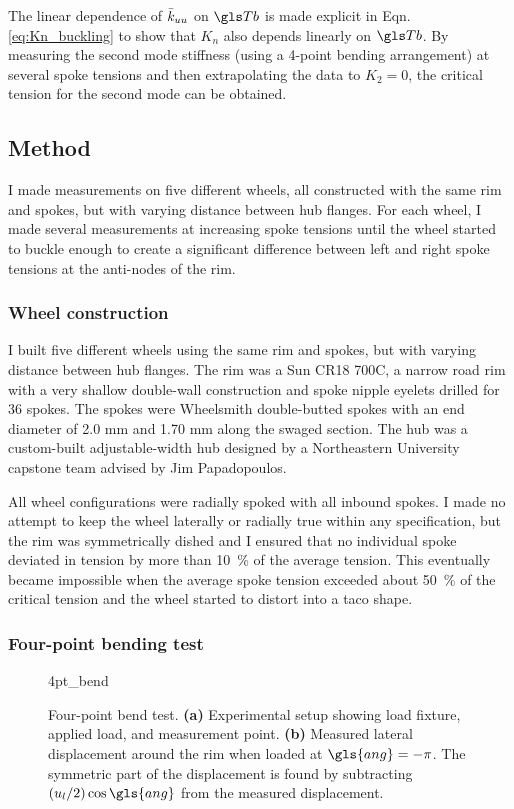 \documentclass[\rootdir/thesis.tex]{subfiles}
\begin{document}
The linear dependence of $\bar{k}_{uu}$ on $\Tb$ is made explicit in Eqn. \eqref{eq:Kn_buckling} to show that $K_n$ also depends linearly on $\Tb$. By measuring the second mode stiffness (using a 4-point bending arrangement) at several spoke tensions and then extrapolating the data to $K_2 = 0$, the critical tension for the second mode can be obtained.

\subsection{Method}

I made measurements on five different wheels, all constructed with the same rim and spokes, but with varying distance between hub flanges. For each wheel, I made several measurements at increasing spoke tensions until the wheel started to buckle enough to create a significant difference between left and right spoke tensions at the anti-nodes of the rim.

\subsubsection{Wheel construction}

I built five different wheels using the same rim and spokes, but with varying distance between hub flanges. The rim was a Sun CR18 700C, a narrow road rim with a very shallow double-wall construction and spoke nipple eyelets drilled for 36 spokes. The spokes were Wheelsmith double-butted spokes with an end diameter of 2.0 mm and 1.70 mm along the swaged section. The hub was a custom-built adjustable-width hub designed by a Northeastern University capstone team advised by Jim Papadopoulos.

All wheel configurations were radially spoked with all inbound spokes. I made no attempt to keep the wheel laterally or radially true within any specification, but the rim was symmetrically dished and I ensured that no individual spoke deviated in tension by more than \SI{10}{\percent} of the average tension. This eventually became impossible when the average spoke tension exceeded about \SI{50}{\percent} of the critical tension and the wheel started to distort into a taco shape.

\subsubsection{Four-point bending test}

\begin{figure}[t]
\centering
{4pt_bend}
\caption{Four-point bend test. \textbf{(a)} Experimental setup showing load fixture, applied load, and measurement point. \textbf{(b)} Measured lateral displacement around the rim when loaded at $\gls{ang}=-\pi$. The symmetric part of the displacement is found by subtracting $(u_l/2)\cos{\gls{ang}}$ from the measured displacement.}
\label{fig:4pt_bend_setup}
\end{figure}
\end{document}
